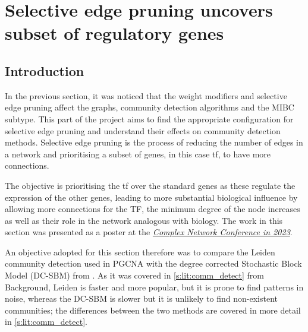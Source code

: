 \chapter{Selective edge pruning uncovers subset of regulatory genes} \label{s:N_I:sel_pruning}
\vspace{3mm}
\vspace{3mm}

\section{Introduction}

In the previous section, it was noticed that the weight modifiers and selective edge pruning affect the graphs, community detection algorithms and the MIBC subtype. This part of the project aims to find the appropriate configuration for selective edge pruning and understand their effects on community detection methods. Selective edge pruning is the process of reducing the number of edges in a network and prioritising a subset of genes, in this case \acrfull{tf}, to have more connections.

The objective is prioritising the \acrshort{tf} over the standard genes as these regulate the expression of the other genes, leading to more substantial biological influence by allowing more connections for the TF, the minimum degree of the node increases as well as their role in the network analogous with biology. The work in this section was presented as a poster at the \textit{\href{https://2023.complexnetworks.org/}{Complex Network Conference in 2023}}.


An objective adopted for this section therefore was to compare the Leiden \citep{Traag2019-ne} community detection used in PGCNA with the degree corrected Stochastic Block Model (DC-SBM) from \citep{Karrer2011-si, Peixoto2017-gc}. As it was covered in \cref{s:lit:comm_detect} from Background, Leiden is faster and more popular, but it is prone to find patterns in noise, whereas the DC-SBM is slower but it is unlikely to find non-existent communities; the differences between the two methods are covered in more detail in \cref{s:lit:comm_detect}. 

